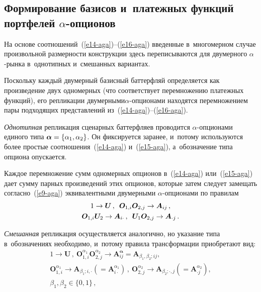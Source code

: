\begin{multicols}{2}
  \section{Формирование базисов и~платежных функций 
портфелей $\alpha$-опционов}
  
  На основе соотношений~(\ref{e14-aga})--(\ref{e16-aga}) введенные 
  в~многомерном случае произвольной размерности конструкции здесь 
переписываются для двумерного  
$\alpha$-рын\-ка в~однотипных и~смешанных вариантах. 
  
  Поскольку каждый двумерный базисный баттерфляй определяется как 
произведение двух одномерных (что соответствует перемножению платежных 
функций), его репликации двумерными\linebreak $\alpha$-оп\-ци\-она\-ми находятся 
перемножением пары подходящих представлений  
из~(\ref{e14-aga})--(\ref{e16-aga}). 
  
  \textit{Однотипная} репликация сценарных баттерфляев проводится 
  $\alpha$-оп\-ци\-она\-ми единого типа $\bm{\alpha}\hm=\{\alpha_1, \alpha_2\}$. Он фиксируется 
заранее, и~потому используются более простые соотношения~(\ref{e14-aga}) 
и~(\ref{e15-aga}), а~обозначение типа опциона опускается. 
  
  Каждое перемножение сумм одномерных опционов в~(\ref{e14-aga}) 
или~(\ref{e15-aga}) дает сумму парных произведений этих опционов, которые 
затем следует замещать согласно~(\ref{e9-aga}) эквивалентными двумерными 
$\alpha$-оп\-ци\-она\-ми по правилам 
  \begin{multline}
  1\to \bm{U}\,,\enskip \bm{O}_{1,i}\bm{O}_{2,j}\to \bm{A}_{ij}\,,\\ 
\bm{O}_{1,i}\bm{U}_2\to \bm{A}_{i\cdot}\,,\enskip \bm{U}_1 \bm{O}_{2,j}\to 
\bm{A}_{\cdot j}\,.
  \label{e17-aga}
  \end{multline}
  
  \textit{Смешанная} репликация осуществляется аналогично, но указание типа в~обозначениях необходимо, и~потому правила трансформации приобретают 
вид: 
  \begin{multline}
  1\to \bm{U}\,,\ \bm{O}_{1,i}^{\alpha_1} \bm{O}_{2,j}^{\alpha_2} \to 
\bm{A}_{ij}^{\bm {\alpha}}=\bm{A}_{\beta_1,\beta_2;ij},\\
\bm{O}_{1,i}^{\alpha_1}\to \bm{A}_{\beta_1;i,\cdot} \left( = 
\bm{A}^{\alpha_1}_{i\cdot}\right)\,,\ \bm{O}^{\alpha_2}_{2,j} \to 
\bm{A}_{\beta_2;\cdot,j}\left( =\bm{A}^{\alpha_2}_{\cdot j}\right),\\
 \beta_1,\beta_2\in  \{0,1\}\,,
\label{e18-aga}
\end{multline}
  

\end{multicols}
